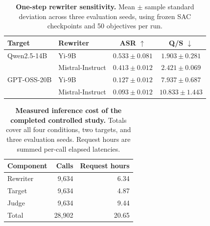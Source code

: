 \begin{table}[t]
\centering
\small
\caption{\textbf{One-step rewriter sensitivity.}
Mean $\pm$ sample standard deviation across three evaluation
seeds, using frozen SAC checkpoints and 50 objectives per run.}
\label{tab:rewriter_sensitivity}

\begin{tabular}{llcc}
\toprule
\textbf{Target}
& \textbf{Rewriter}
& \textbf{ASR} $\uparrow$
& \textbf{Q/S} $\downarrow$ \\
\midrule
Qwen2.5-14B
& Yi-9B
& $0.533\pm0.081$
& $1.903\pm0.281$ \\
& Mistral-Instruct
& $0.413\pm0.012$
& $2.421\pm0.069$ \\
\midrule
GPT-OSS-20B
& Yi-9B
& $0.127\pm0.012$
& $7.937\pm0.687$ \\
& Mistral-Instruct
& $0.093\pm0.012$
& $10.833\pm1.443$ \\
\bottomrule
\end{tabular}
\end{table}

\begin{table}[t]
\centering
\small
\caption{\textbf{Measured inference cost of the completed controlled study.}
Totals cover all four conditions, two targets, and three evaluation
seeds. Request hours are summed per-call elapsed latencies.}
\label{tab:controlled_cost}
\begin{tabular}{lrr}
\toprule
\textbf{Component} & \textbf{Calls} & \textbf{Request hours} \\
\midrule
Rewriter & 9,634 & 6.34 \\
Target & 9,634 & 4.87 \\
Judge & 9,634 & 9.44 \\
\midrule
Total & 28,902 & 20.65 \\
\bottomrule
\end{tabular}
\end{table}
